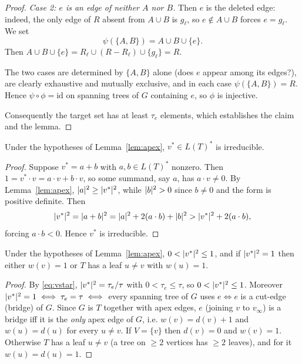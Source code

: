 \begin{proof}
\emph{Case 2: $e$ is an edge of neither $A$ nor $B$.}  Then $e$ is the deleted edge: indeed,
the only edge of $R$ absent from $A\cup B$ is $g_\ell$, so $e\notin A\cup B$ forces $e=g_\ell$.
We set
\[
\psi(\{A,B\})=A\cup B\cup\{e\}.
\]
Then $A\cup B\cup\{e\}=R_\ell\cup(R-R_\ell)\cup\{g_\ell\}=R$.

The two cases are determined by $\{A,B\}$ alone (does $e$ appear among its edges?), are
clearly exhaustive and mutually exclusive, and in each case $\psi(\{A,B\})=R$.  Hence
$\psi\circ\phi=\mathrm{id}$ on spanning trees of $G$ containing $e$, so $\phi$ is injective.

\smallskip
Consequently the target set has at least $\tau_e$ elements, which establishes the claim and
the lemma.
\end{proof}

\begin{cor}
\label{cor:apex}
Under the hypotheses of Lemma~\ref{lem:apex}, $v^\ast\in L(T)^\ast$ is irreducible.
\end{cor}

\begin{proof}
Suppose $v^\ast=a+b$ with $a,b\in L(T)^\ast$ nonzero.  Then
$1=v^\ast\cdot v=a\cdot v+b\cdot v$, so some summand, say $a$, has $a\cdot v\ne0$.  By
Lemma~\ref{lem:apex}, $\lvert a\rvert^{2}\ge\lvert v^\ast\rvert^{2}$, while $\lvert b\rvert^{2}>0$ since $b\ne0$ and the form
is positive definite.  Then
\[
\lvert v^\ast\rvert^{2}=\lvert a+b\rvert^{2}=\lvert a\rvert^{2}+2(a\cdot b)+\lvert b\rvert^{2}>\lvert v^\ast\rvert^{2}+2(a\cdot b),
\]
forcing $a\cdot b<0$.  Hence $v^\ast$ is irreducible.
\end{proof}

\begin{cor}
\label{cor:tight}
Under the hypotheses of Lemma~\ref{lem:apex}, $0<\lvert v^\ast\rvert^{2}\le1$, and if $\lvert v^\ast\rvert^{2}=1$
then either $w(v)=1$ or $T$ has a leaf $u\ne v$ with $w(u)=1$.
\end{cor}

\begin{proof}
By \eqref{eq:vstar}, $\lvert v^\ast\rvert^{2}=\tau_e/\tau$ with $0<\tau_e\le\tau$, so
$0<\lvert v^\ast\rvert^{2}\le1$.  Moreover $\lvert v^\ast\rvert^{2}=1\iff\tau_e=\tau\iff$ every spanning tree of
$G$ uses $e\iff e$ is a cut-edge (bridge) of $G$.  Since $G$ is $T$ together with apex edges,
$e$ (joining $v$ to $v_\infty$) is a bridge iff it is the \emph{only} apex edge of $G$, i.e.
$w(v)=d(v)+1$ and $w(u)=d(u)$ for every $u\ne v$.  If $V=\{v\}$ then $d(v)=0$ and
$w(v)=1$.  Otherwise $T$ has a leaf $u\ne v$ (a tree on $\ge2$ vertices has $\ge2$ leaves),
and for it $w(u)=d(u)=1$.
\end{proof}

